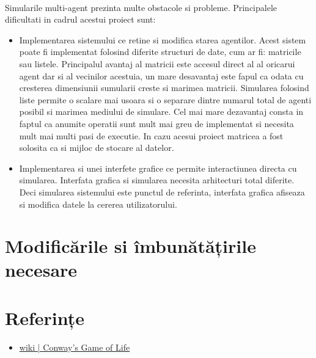 \documentclass[11pt ,A4]{article}
\begin{document}
        \paragraph{} Simularile multi-agent prezinta multe obstacole si probleme. Principalele dificultati in cadrul acestui proiect sunt:
        \begin{itemize}
            \item Implementarea sistemului ce retine si modifica starea agentilor. Acest sistem poate fi implementat folosind diferite structuri de date, cum ar fi: matricile sau listele. Principalul avantaj al matricii este accesul direct al al oricarui agent dar si al vecinilor acestuia, un mare desavantaj este fapul ca odata cu cresterea dimensiunii sumularii creste si marimea matricii. Simularea folosind liste permite o scalare mai usoara si o separare dintre numarul total de agenti posibil si marimea mediului de simulare. Cel mai mare dezavantaj consta in faptul ca anumite operatii sunt mult mai greu de implementat si necesita mult mai multi pasi de executie. In cazu acesui proiect matricea a fost solosita ca si mijloc de stocare al datelor.

            \item Implementarea si unei interfete grafice ce permite interactiunea directa cu simularea. Interfata grafica si simularea necesita arhitecturi total diferite. Deci simularea sistemului este punctul de referinta, interfata grafica afiseaza si modifica datele la cererea utilizatorului.
        \end{itemize}

    \section{Modificările si îmbunătățirile necesare}

    \section{Referințe}

        \begin{itemize}
            \item \href{https://en.wikipedia.org/wiki/Conway%27s_Game_of_Life}{wiki | Conway's Game of Life}
        \end{itemize}
\end{document}
